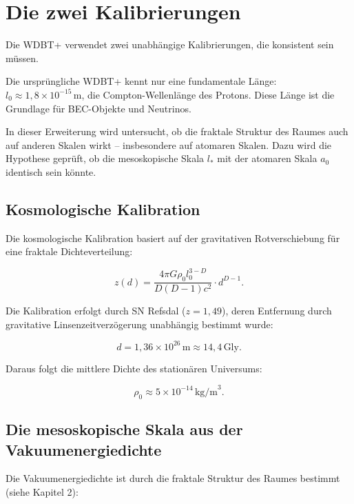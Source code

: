 \chapter{Die zwei Kalibrierungen}

Die WDBT+ verwendet zwei unabhängige Kalibrierungen, die konsistent sein müssen.

Die ursprüngliche WDBT+ kennt nur eine fundamentale Länge: \( l_0 \approx 1,8 \times 10^{-15} \, \text{m} \), die Compton-Wellenlänge des Protons. Diese Länge ist
die Grundlage für BEC-Objekte und Neutrinos.

In dieser Erweiterung wird untersucht, ob die fraktale Struktur des Raumes auch auf anderen Skalen wirkt – insbesondere auf atomaren Skalen. Dazu wird die Hypothese
geprüft, ob die mesoskopische Skala \( l_* \) mit der atomaren Skala \( a_0 \) identisch sein könnte.

\section{Kosmologische Kalibration}

Die kosmologische Kalibration basiert auf der gravitativen Rotverschiebung für eine fraktale Dichteverteilung:

\begin{equation}
z(d) = \frac{4\pi G \rho_0 l_0^{3-D}}{D(D-1)c^2} \cdot d^{D-1}. \tag{8.1}
\end{equation}

Die Kalibration erfolgt durch SN Refsdal (\( z = 1,49 \)), deren Entfernung durch gravitative Linsenzeitverzögerung unabhängig bestimmt wurde:

\begin{equation}
d = 1,36 \times 10^{26} \, \text{m} \approx 14,4 \, \text{Gly}. \tag{8.2}
\end{equation}

Daraus folgt die mittlere Dichte des stationären Universums:

\begin{equation}
\rho_0 \approx 5 \times 10^{-14} \, \text{kg/m}^3. \tag{8.3}
\end{equation}

\section{Die mesoskopische Skala aus der Vakuumenergiedichte}

Die Vakuumenergiedichte ist durch die fraktale Struktur des Raumes bestimmt (siehe Kapitel 2):

